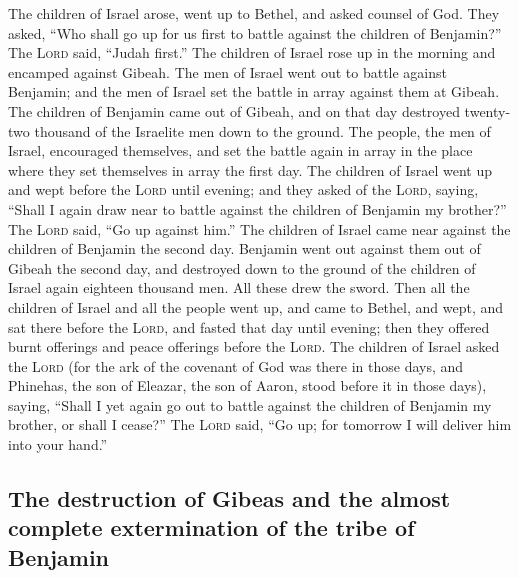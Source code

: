  The children of Israel arose, went up to Bethel, and
asked counsel of God. They asked, ``Who shall go up for us first to
battle against the children of Benjamin?'' The \textsc{Lord} said,
``Judah first.''  The children of Israel rose up in the
morning and encamped against Gibeah.  The men of Israel
went out to battle against Benjamin; and the men of Israel set the
battle in array against them at Gibeah.  The children of
Benjamin came out of Gibeah, and on that day destroyed twenty-two
thousand of the Israelite men down to the ground.  The
people, the men of Israel, encouraged themselves, and set the battle
again in array in the place where they set themselves in array the first
day.  The children of Israel went up and wept before the
\textsc{Lord} until evening; and they asked of the \textsc{Lord},
saying, ``Shall I again draw near to battle against the children of
Benjamin my brother?'' The \textsc{Lord} said, ``Go up against him.''
 The children of Israel came near against the children of
Benjamin the second day.  Benjamin went out against them
out of Gibeah the second day, and destroyed down to the ground of the
children of Israel again eighteen thousand men. All these drew the
sword.  Then all the children of Israel and all the
people went up, and came to Bethel, and wept, and sat there before the
\textsc{Lord}, and fasted that day until evening; then they offered
burnt offerings and peace offerings before the \textsc{Lord}.
 The children of Israel asked the \textsc{Lord} (for the
ark of the covenant of God was there in those days,  and
Phinehas, the son of Eleazar, the son of Aaron, stood before it in those
days), saying, ``Shall I yet again go out to battle against the children
of Benjamin my brother, or shall I cease?'' The \textsc{Lord} said, ``Go
up; for tomorrow I will deliver him into your hand.''

\hypertarget{the-destruction-of-gibeas-and-the-almost-complete-extermination-of-the-tribe-of-benjamin}{%
\subsection{The destruction of Gibeas and the almost complete
extermination of the tribe of
Benjamin}\label{the-destruction-of-gibeas-and-the-almost-complete-extermination-of-the-tribe-of-benjamin}}

